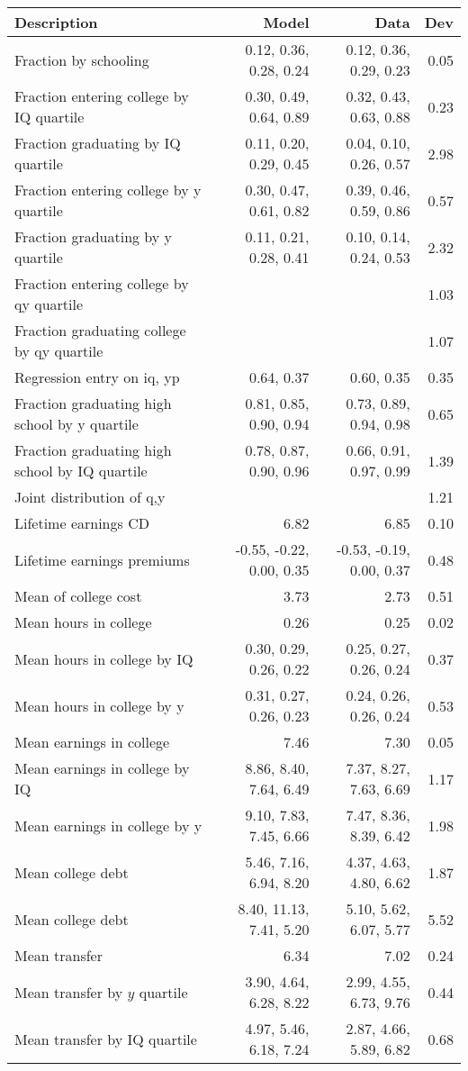 \begin{tabular}{lrrr}
\hline
Description & Model  & Data  & Dev  \\ 
\hline
Fraction by schooling & 0.12, 0.36, 0.28, 0.24  & 0.12, 0.36, 0.29, 0.23  & 0.05  \\ 
Fraction entering college by IQ quartile & 0.30, 0.49, 0.64, 0.89  & 0.32, 0.43, 0.63, 0.88  & 0.23  \\ 
Fraction graduating by IQ quartile & 0.11, 0.20, 0.29, 0.45  & 0.04, 0.10, 0.26, 0.57  & 2.98  \\ 
Fraction entering college by y quartile & 0.30, 0.47, 0.61, 0.82  & 0.39, 0.46, 0.59, 0.86  & 0.57  \\ 
Fraction graduating by y quartile & 0.11, 0.21, 0.28, 0.41  & 0.10, 0.14, 0.24, 0.53  & 2.32  \\ 
Fraction entering college by qy quartile &   &   & 1.03  \\ 
Fraction graduating college by qy quartile &   &   & 1.07  \\ 
Regression entry on iq, yp & 0.64, 0.37  & 0.60, 0.35  & 0.35  \\ 
Fraction graduating high school by y quartile & 0.81, 0.85, 0.90, 0.94  & 0.73, 0.89, 0.94, 0.98  & 0.65  \\ 
Fraction graduating high school by IQ quartile & 0.78, 0.87, 0.90, 0.96  & 0.66, 0.91, 0.97, 0.99  & 1.39  \\ 
Joint distribution of q,y &   &   & 1.21  \\ 
Lifetime earnings CD & 6.82  & 6.85  & 0.10  \\ 
Lifetime earnings premiums & -0.55, -0.22, 0.00, 0.35  & -0.53, -0.19, 0.00, 0.37  & 0.48  \\ 
Mean of college cost & 3.73  & 2.73  & 0.51  \\ 
Mean hours in college & 0.26  & 0.25  & 0.02  \\ 
Mean hours in college by IQ & 0.30, 0.29, 0.26, 0.22  & 0.25, 0.27, 0.26, 0.24  & 0.37  \\ 
Mean hours in college by y & 0.31, 0.27, 0.26, 0.23  & 0.24, 0.26, 0.26, 0.24  & 0.53  \\ 
Mean earnings in college & 7.46  & 7.30  & 0.05  \\ 
Mean earnings in college by IQ & 8.86, 8.40, 7.64, 6.49  & 7.37, 8.27, 7.63, 6.69  & 1.17  \\ 
Mean earnings in college by y & 9.10, 7.83, 7.45, 6.66  & 7.47, 8.36, 8.39, 6.42  & 1.98  \\ 
Mean college debt & 5.46, 7.16, 6.94, 8.20  & 4.37, 4.63, 4.80, 6.62  & 1.87  \\ 
Mean college debt & 8.40, 11.13, 7.41, 5.20  & 5.10, 5.62, 6.07, 5.77  & 5.52  \\ 
Mean transfer & 6.34  & 7.02  & 0.24  \\ 
Mean transfer by $y$ quartile & 3.90, 4.64, 6.28, 8.22  & 2.99, 4.55, 6.73, 9.76  & 0.44  \\ 
Mean transfer by IQ quartile & 4.97, 5.46, 6.18, 7.24  & 2.87, 4.66, 5.89, 6.82  & 0.68  \\ 
\hline
\end{tabular}%
